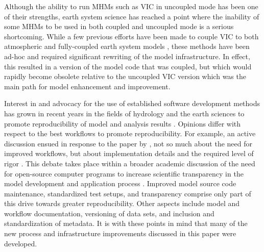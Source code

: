 \documentclass[gmd, manuscript]{copernicus}
\begin{document}
  Although the ability to run MHMs such as VIC in uncoupled mode has been one of their strengths, earth system science has reached a point where the inability of some MHMs to be used in both coupled and uncoupled mode is a serious shortcoming. While a few previous efforts have been made to couple VIC to both atmospheric and fully-coupled earth system models \citep[e.g.][]{Zhu_2009,Hamman_2016a}, these methods have been ad-hoc and required significant rewriting of the model infrastructure. In effect, this resulted in a version of the model code that was coupled, but which would rapidly become obsolete relative to the uncoupled VIC version which was the main path for model enhancement and improvement.

  Interest in and advocacy for the use of established software development methods has grown in recent years in the fields of hydrology and the earth sciences to promote reproducibility of model and analysis results \citep[e.g.][]{Wilson_2014,Ceola_2015,Fienen_2016,Gil_2016,Hutton_2016}. Opinions differ with respect to the best workflows to promote reproducibility. For example, an active discussion ensued in response to the paper by \citet{Hutton_2016}, not so much about the need for improved workflows, but about implementation details and the required level of rigor \citep{Anel_2017,Melsen_2017,Hut_2017,Hutton_2017a,Hutton_2017b}. This debate takes place within a broader academic discussion of the need for open-source computer programs to increase scientific transparency in the model development and application process \citep{Ince_2012}. Improved model source code maintenance, standardized test setups, and transparency comprise only part of this drive towards greater reproducibility. Other aspects include model and workflow documentation, versioning of data sets, and inclusion and standardization of metadata. It is with these points in mind that many of the new process and infrastructure improvements discussed in this paper were developed.
\end{document}
